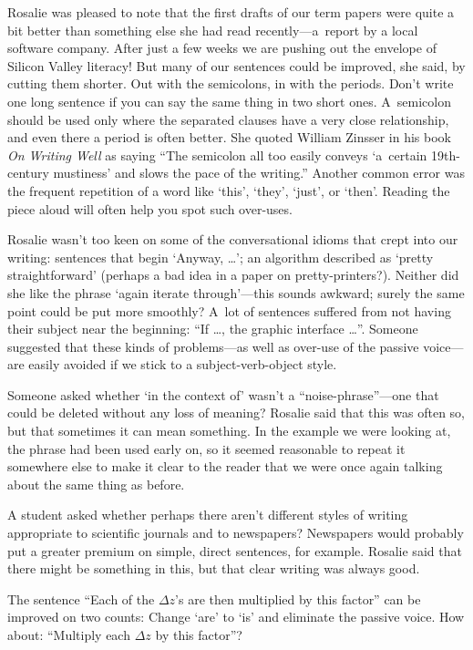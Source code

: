 Rosalie was pleased to note that  the first drafts of our term
papers were quite a bit better than something else she had read
recently---a~report by a local software company. After just a few
weeks we are pushing out the envelope of Silicon Valley literacy!
But many of our sentences could be improved, she said,  by cutting
them shorter. Out with the semicolons, in with the periods. Don't
write one long sentence if you can say the same thing in two short
ones. A~semicolon should be used only where the separated clauses
have a very close relationship, and even there a period is often
better. 
She quoted William Zinsser in his book {\sl On Writing Well\/}
as saying ``The semicolon all too easily conveys `a~certain
19th-century mustiness' and slows the pace of the writing.'' Another
common error was the frequent repetition of a word like `this',
`they', `just', or `then'. Reading the piece aloud will often help you
spot such over-uses.

Rosalie wasn't too keen on some of the conversational idioms that
crept into our writing: sentences that begin `Anyway, \dots'; an
algorithm described as `pretty straightforward' (perhaps a bad idea
in a paper on pretty-printers?). Neither did she like the phrase
`again iterate through'---this sounds awkward; surely the same point
could be put more smoothly? A~lot of sentences suffered from not
having their subject near the beginning: ``If \dots, the
graphic interface \dots''. Someone suggested that these kinds of
problems---as well as over-use of the passive voice---are easily
avoided if we stick to a subject-verb-object style.

Someone asked whether `in the context of' wasn't a ``noise-phrase''---one
 that could be deleted without any loss of meaning?  Rosalie said
that this was often so, but that sometimes it can mean something. In
the example we were looking at, the phrase had been used early on, so
it seemed reasonable to repeat it somewhere else to make it clear to
the reader that we were  once again talking about the same thing as before.

A student asked whether perhaps there aren't different styles of
writing appropriate to scientific journals and to newspapers?
Newspapers would probably put a greater premium on simple, direct
sentences, for example. Rosalie said that there might be something in
this, but that clear writing was always good.

The sentence ``Each of the $\Delta z$'s are then multiplied by this
factor'' can be improved on two counts: Change
`are' to `is' and eliminate the
passive voice. How about: ``Multiply each $\Delta z$
by this factor''?

